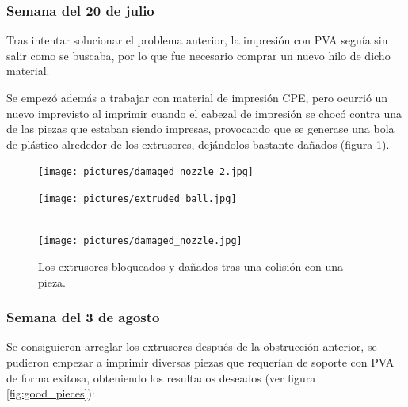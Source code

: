\subsubsection*{Semana del 20 de julio}
Tras intentar solucionar el problema anterior, la impresión con \ac{PVA} seguía sin
salir como se buscaba, por lo que fue necesario comprar un nuevo hilo de dicho material.

Se empezó además a trabajar con material de impresión \ac{CPE}, pero ocurrió un nuevo
imprevisto al imprimir cuando el cabezal de impresión se chocó contra una de las piezas
que estaban siendo impresas, provocando que se generase una bola de plástico alrededor 
de los extrusores, dejándolos bastante dañados (figura \ref{fig:damaged_nozzle}).

\begin{figure}[H]
    \centering
    \begin{minipage}{.49\linewidth}
        \texttt{[image: pictures/damaged\_nozzle\_2.jpg]}
    \end{minipage}
    \hfill
    \begin{minipage}{.49\linewidth}
        \texttt{[image: pictures/extruded\_ball.jpg]}
    \end{minipage}
    \hfill \\[1ex]
    \texttt{[image: pictures/damaged\_nozzle.jpg]}
    \caption{Los extrusores bloqueados y dañados tras una colisión con una pieza.}
    \label{fig:damaged_nozzle}
\end{figure}

\subsubsection*{Semana del 3 de agosto}
Se consiguieron arreglar los extrusores después de la obstrucción anterior, se pudieron
empezar a imprimir diversas piezas que requerían de soporte con \ac{PVA} de forma
exitosa, obteniendo los resultados deseados (ver figura \ref{fig:good_pieces}):


